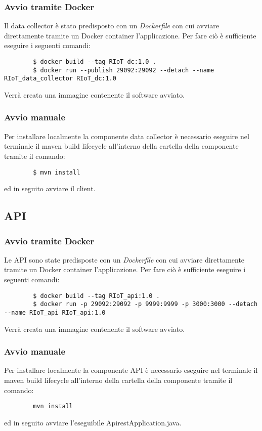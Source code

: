 		\subsubsection{Avvio tramite Docker}
		Il data collector è stato predisposto con un \textit{Dockerfile} con cui avviare direttamente tramite un Docker container l'applicazione. Per fare ciò è sufficiente eseguire i seguenti comandi:
		\begin{verbatim}
		$ docker build --tag RIoT_dc:1.0 .
		$ docker run --publish 29092:29092 --detach --name RIoT_data_collector RIoT_dc:1.0
		\end{verbatim}
		Verrà creata una immagine contenente il software avviato.

		\subsubsection{Avvio manuale}
		Per installare localmente la componente data collector è necessario eseguire nel terminale il maven build lifecycle all'interno della cartella della componente tramite il comando:
		\begin{verbatim}
		$ mvn install
		\end{verbatim}
		ed in seguito avviare il client.

	\subsection{API}

		\subsubsection{Avvio tramite Docker}
		Le API sono state predisposte con un \textit{Dockerfile} con cui avviare direttamente tramite un Docker container l'applicazione. Per fare ciò è sufficiente eseguire i seguenti comandi:
		\begin{verbatim}
		$ docker build --tag RIoT_api:1.0 .
		$ docker run -p 29092:29092 -p 9999:9999 -p 3000:3000 --detach --name RIoT_api RIoT_api:1.0
		\end{verbatim}
		Verrà creata una immagine contenente il software avviato.

		\subsubsection{Avvio manuale}
		Per installare localmente la componente API è necessario eseguire nel terminale il maven build lifecycle all'interno della cartella della componente tramite il comando:
		\begin{verbatim}
		mvn install
		\end{verbatim}
		ed in seguito avviare l'eseguibile ApirestApplication.java.

